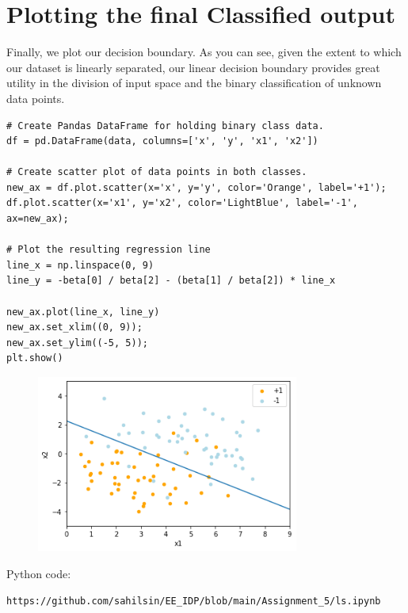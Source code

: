 \documentclass[journal,12pt,twocolumn]{IEEEtran}
\begin{document}
\section{Plotting the final Classified output}
Finally, we plot our decision boundary. As you can see, given the extent to which our dataset is linearly separated, our linear decision boundary provides great utility in the division of input space and the binary classification of unknown data points.
\begin{lstlisting}
# Create Pandas DataFrame for holding binary class data.
df = pd.DataFrame(data, columns=['x', 'y', 'x1', 'x2'])

# Create scatter plot of data points in both classes.
new_ax = df.plot.scatter(x='x', y='y', color='Orange', label='+1');
df.plot.scatter(x='x1', y='x2', color='LightBlue', label='-1', ax=new_ax);

# Plot the resulting regression line
line_x = np.linspace(0, 9)
line_y = -beta[0] / beta[2] - (beta[1] / beta[2]) * line_x

new_ax.plot(line_x, line_y)
new_ax.set_xlim((0, 9));
new_ax.set_ylim((-5, 5));
plt.show()
\end{lstlisting}

\begin{figure}[!h]
\begin{center}
\includegraphics[width=3.4in]{figs/x5.png}
\end{center}
\caption{}
\label{fig:2}
\end{figure}

Python code:
\begin{lstlisting}
https://github.com/sahilsin/EE_IDP/blob/main/Assignment_5/ls.ipynb
\end{lstlisting}
\end{document}
